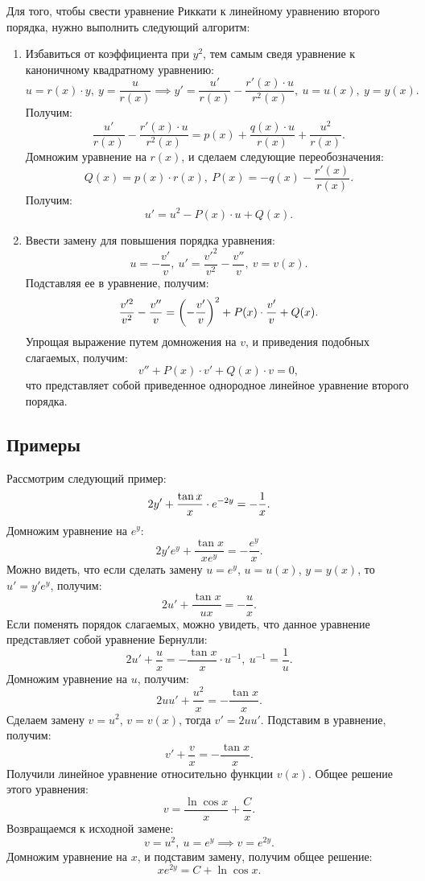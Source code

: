 	Для того, чтобы свести уравнение Риккати к линейному уравнению второго порядка, нужно выполнить следующий алгоритм:
	\begin{enumerate}
		\item Избавиться от коэффициента при $y^2$, тем самым сведя уравнение к каноничному квадратному уравнению:
		\[ u = r(x) \cdot y, ~ y = \frac{u}{r(x)} \implies y' = \frac{u'}{r(x)} - \frac{r'(x) \cdot u}{r^2(x)}, ~ u = u(x), ~ y = y(x). \]
		Получим:
		\[ \frac{u'}{r(x)} - \frac{r'(x) \cdot u}{r^2(x)} = p(x) + \frac{q(x) \cdot u}{r(x)} + \frac{u^2}{r(x)}. \]
		Домножим уравнение на $r(x)$, и сделаем следующие переобозначения:
		\[ Q(x) = p(x) \cdot r(x), ~ P(x) = - q(x) - \frac{r'(x)}{r(x)}. \]
		Получим:
		\[ u' = u^2 - P(x) \cdot u + Q(x). \]
		\item Ввести замену для повышения порядка уравнения:
		\[ u = -\frac{v'}{v}, ~ u' = \frac{v'^2}{v^2} - \frac{v''}{v}, ~ v = v(x). \]
		Подставляя ее в уравнение, получим:
		\[ \frac{v'^2}{v^2} - \frac{v''}{v} = \left( -\frac{v'}{v} \right)^2 + P(x) \cdot \frac{v'}{v} + Q(x). \]
		Упрощая выражение путем домножения на $v$, и приведения подобных слагаемых, получим:
		\[ v'' + P(x) \cdot v' + Q(x) \cdot v = 0, \]
		что представляет собой приведенное однородное линейное уравнение второго порядка.
	\end{enumerate}

	\subsection{Примеры}

		Рассмотрим следующий пример:
		\[ 2y' + \frac{\tan{x}}{x} \cdot e^{-2y} = - \dfrac{1}{x}. \]
		Домножим уравнение на $e^{y}$:
		\[ 2y' e^{y} + \frac{\tan{x}}{x e^{y}} = - \frac{e^{y}}{x}. \]
		Можно видеть, что если сделать замену $u = e^{y}$, $u = u(x)$, $y = y(x)$, то $u' = y' e^{y}$, получим:
		\[ 2u' + \frac{\tan{x}}{ux} = - \frac{u}{x}. \]
		Если поменять порядок слагаемых, можно увидеть, что данное уравнение представляет собой уравнение Бернулли:
		\[ 2u' + \frac{u}{x} = -\frac{\tan{x}}{x} \cdot u^{-1}, ~ u^{-1} = \frac{1}{u}. \]
		Домножим уравнение на $u$, получим:
		\[ 2uu' + \frac{u^2}{x} = - \frac{\tan{x}}{x}. \]
		Сделаем замену $v = u^2$, $v = v(x)$, тогда $v' = 2uu'$. Подставим в уравнение, получим:
		\[ v' + \frac{v}{x} = - \frac{\tan{x}}{x}. \]
		Получили линейное уравнение относительно функции $v(x)$. Общее решение этого уравнения:
		\[ v = \frac{\ln{\cos{x}}}{x} + \frac{C}{x}. \]
		Возвращаемся к исходной замене:
		\[ v = u^2, ~ u = e^{y} \implies v = e^{2y}. \]
		Домножим уравнение на $x$, и подставим замену, получим общее решение:
		\[ xe^{2y} = C + \ln{\cos{x}}. \]

